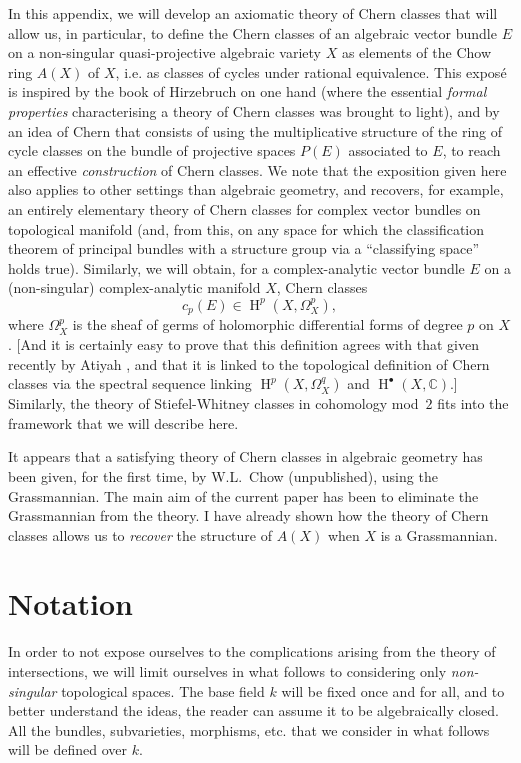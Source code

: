 \documentclass{article}
\theoremstyle{plain}
\theoremstyle{definition}
\DeclareMathOperator{\HH}{H}
\newcommand{\oldpage}[1]{\marginpar{\footnotesize$\Big\vert$ \textit{p.~#1}}}
\begin{document}
\oldpage{137}
In this appendix, we will develop an axiomatic theory of Chern classes that will allow us, in particular, to define the Chern classes of an algebraic vector bundle $E$ on a non-singular quasi-projective algebraic variety $X$ as elements of the Chow ring $A(X)$ of $X$, i.e. as classes of cycles under rational equivalence.
This expos\'{e} is inspired by the book of Hirzebruch on one hand (where the essential \emph{formal properties} characterising a theory of Chern classes was brought to light), and by an idea of Chern \cite{2} that consists of using the multiplicative structure of the ring of cycle classes on the bundle of projective spaces $P(E)$ associated to $E$, to reach an effective \emph{construction} of Chern classes.
We note that the exposition given here also applies to other settings than algebraic geometry, and recovers, for example, an entirely elementary theory of Chern classes for complex vector bundles on topological manifold (and, from this, on any space for which the classification theorem of principal bundles with a structure group via a ``classifying space'' holds true).
Similarly, we will obtain, for a complex-analytic vector bundle $E$ on a (non-singular) complex-analytic manifold $X$, Chern classes
\[
  c_p(E) \in \HH^p(X,\Omega_X^p),
\]
where $\Omega_X^p$ is the sheaf of germs of holomorphic differential forms of degree $p$ on $X$.
[And it is certainly easy to prove that this definition agrees with that given recently by Atiyah \cite{1}, and that it is linked to the topological definition of Chern classes via the spectral sequence linking $\HH^p(X,\Omega_X^q)$ and $\HH^\bullet(X,\mathbb{C})$.]
Similarly, the theory of
\oldpage{138}
Stiefel-Whitney classes in cohomology mod~$2$ fits into the framework that we will describe here.

It appears that a satisfying theory of Chern classes in algebraic geometry has been given, for the first time, by W.L.~Chow (unpublished), using the Grassmannian.
The main aim of the current paper has been to eliminate the Grassmannian from the theory.
I have already shown \cite{4} how the theory of Chern classes allows us to \emph{recover} the structure of $A(X)$ when $X$ is a Grassmannian.


\section{Notation}
\label{section1}

In order to not expose ourselves to the complications arising from the theory of intersections, we will limit ourselves in what follows to considering only \emph{non-singular} topological spaces.
The base field $k$ will be fixed once and for all, and to better understand the ideas, the reader can assume it to be algebraically closed.
All the bundles, subvarieties, morphisms, etc. that we consider in what follows will be defined over $k$.
\end{document}
